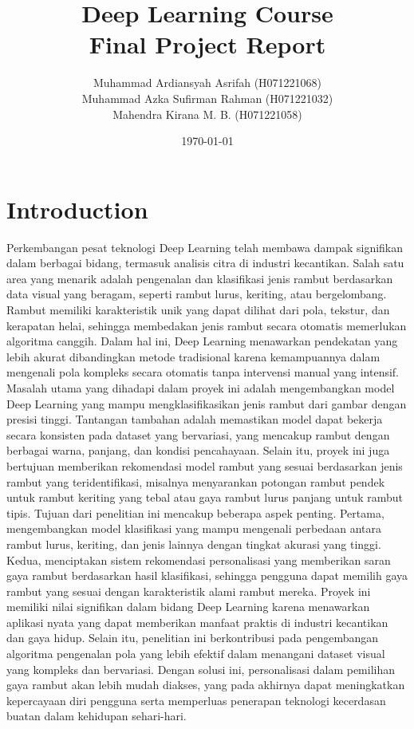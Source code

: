 \documentclass[12pt,a4paper]{article}
\title{\textbf{Deep Learning Course \\ Final Project Report}}
\author{Muhammad Ardiansyah Asrifah (H071221068)\\ Muhammad Azka Sufirman Rahman (H071221032) \\ Mahendra 
Kirana M. B. (H071221058)}
\date{\today}
\begin{document}
\maketitle
\tableofcontents
\newpage

\section{Introduction}
Perkembangan pesat teknologi Deep Learning telah membawa dampak signifikan dalam berbagai bidang, termasuk analisis citra di industri kecantikan. Salah satu area yang menarik adalah pengenalan dan klasifikasi jenis rambut berdasarkan data visual yang beragam, seperti rambut lurus, keriting, atau bergelombang. Rambut memiliki karakteristik unik yang dapat dilihat dari pola, tekstur, dan kerapatan helai, sehingga membedakan jenis rambut secara otomatis memerlukan algoritma canggih. Dalam hal ini, Deep Learning menawarkan pendekatan yang lebih akurat dibandingkan metode tradisional karena kemampuannya dalam mengenali pola kompleks secara otomatis tanpa intervensi manual yang intensif. Masalah utama yang dihadapi dalam proyek ini adalah mengembangkan model Deep Learning yang mampu mengklasifikasikan jenis rambut dari gambar dengan presisi tinggi. Tantangan tambahan adalah memastikan model dapat bekerja secara konsisten pada dataset yang bervariasi, yang mencakup rambut dengan berbagai warna, panjang, dan kondisi pencahayaan. Selain itu, proyek ini juga bertujuan memberikan rekomendasi model rambut yang sesuai berdasarkan jenis rambut yang teridentifikasi, misalnya menyarankan potongan rambut pendek untuk rambut keriting yang tebal atau gaya rambut lurus panjang untuk rambut tipis. Tujuan dari penelitian ini mencakup beberapa aspek penting. Pertama, mengembangkan model klasifikasi yang mampu mengenali perbedaan antara rambut lurus, keriting, dan jenis lainnya dengan tingkat akurasi yang tinggi. Kedua, menciptakan sistem rekomendasi personalisasi yang memberikan saran gaya rambut berdasarkan hasil klasifikasi, sehingga pengguna dapat memilih gaya rambut yang sesuai dengan karakteristik alami rambut mereka. Proyek ini memiliki nilai signifikan dalam bidang Deep Learning karena menawarkan aplikasi nyata yang dapat memberikan manfaat praktis di industri kecantikan dan gaya hidup. Selain itu, penelitian ini berkontribusi pada pengembangan algoritma pengenalan pola yang lebih efektif dalam menangani dataset visual yang kompleks dan bervariasi. Dengan solusi ini, personalisasi dalam pemilihan gaya rambut akan lebih mudah diakses, yang pada akhirnya dapat meningkatkan kepercayaan diri pengguna serta memperluas penerapan teknologi kecerdasan buatan dalam kehidupan sehari-hari.
\end{document}
